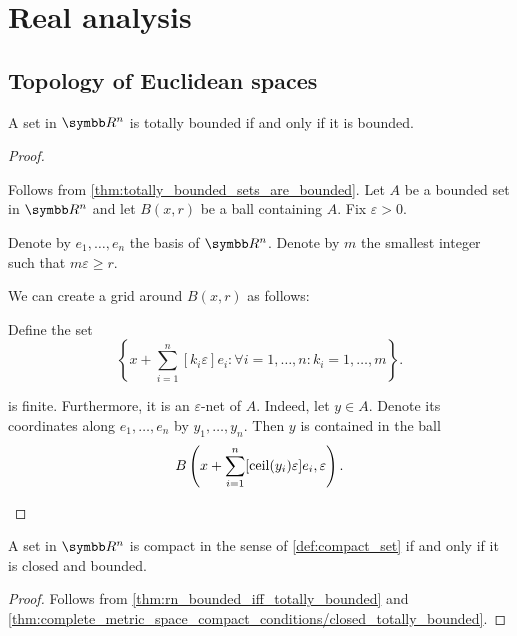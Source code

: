\section{Real analysis}\label{sec:real_analysis}
\subsection{Topology of Euclidean spaces}\label{subsec:real_vector_space_geometry}

\begin{proposition}\label{thm:rn_bounded_iff_totally_bounded}
  A set in \( \R^n \) is totally bounded if and only if it is bounded.
\end{proposition}
\begin{proof}
  \begin{description}
    \Implies Follows from \cref{thm:totally_bounded_sets_are_bounded}.
    \ImpliedBy Let \( A \) be a bounded set in \( \R^n \) and let \( B(x, r) \) be a ball containing \( A \). Fix \( \varepsilon > 0 \).

    Denote by \( e_1, \ldots, e_n \) the basis of \( \R^n \). Denote by \( m \) the smallest integer such that \( m \varepsilon \geq r \).

    We can create a grid around \( B(x, r) \) as follows:

    Define the set
    \begin{equation*}
      \left\{ x + \sum_{i=1}^n [k_i \varepsilon] e_i \colon \forall i = 1, \ldots, n: k_i = 1, \ldots, m \right\}.
    \end{equation*}

    is finite. Furthermore, it is an \( \varepsilon \)-net of \( A \). Indeed, let \( y \in A \). Denote its coordinates along \( e_1, \ldots, e_n \) by \( y_1, \ldots, y_n \). Then \( y \) is contained in the ball
    \begin{equation*}
      B\left(x + \sum_{i=1}^n [\operatorname{ceil}(y_i) \varepsilon] e_i, \varepsilon \right).
    \end{equation*}
  \end{description}
\end{proof}

\begin{theorem}\label{thm:heine_borel}
  A set in \( \R^n \) is compact in the sense of \cref{def:compact_set} if and only if it is closed and bounded.
\end{theorem}
\begin{proof}
  Follows from \cref{thm:rn_bounded_iff_totally_bounded} and \cref{thm:complete_metric_space_compact_conditions/closed_totally_bounded}.
\end{proof}

